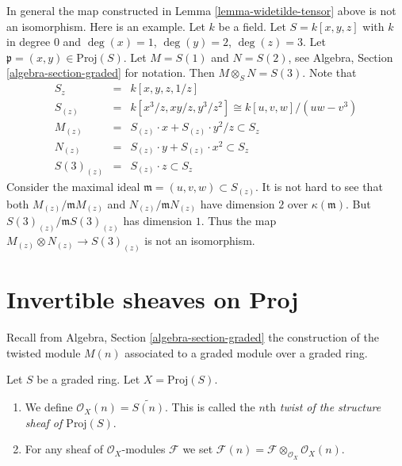 \begin{remark}
\label{remark-not-isomorphism}
In general the map constructed in Lemma \ref{lemma-widetilde-tensor}
above is not an isomorphism. Here is an example. Let $k$
be a field. Let $S = k[x, y, z]$ with $k$ in degree $0$ and
$\deg(x) = 1$, $\deg(y) = 2$, $\deg(z) = 3$.
Let $\mathfrak p = (x, y) \in \text{Proj}(S)$.
Let $M = S(1)$ and $N = S(2)$, see
Algebra, Section \ref{algebra-section-graded}
for notation. Then $M \otimes_S N = S(3)$.
Note that
\begin{eqnarray*}
S_z
& = &
k[x, y, z, 1/z] \\
S_{(z)}
& = &
k[x^3/z, xy/z, y^3/z^2]
\cong
k[u, v, w]/(uw - v^3) \\
M_{(z)} & = & S_{(z)} \cdot x + S_{(z)} \cdot y^2/z \subset S_z \\
N_{(z)} & = & S_{(z)} \cdot y + S_{(z)} \cdot x^2 \subset S_z \\
S(3)_{(z)} & = & S_{(z)} \cdot z \subset S_z
\end{eqnarray*}
Consider the maximal ideal $\mathfrak m = (u, v, w) \subset S_{(z)}$.
It is not hard to see that both $M_{(z)}/\mathfrak mM_{(z)}$
and $N_{(z)}/\mathfrak mN_{(z)}$ have dimension $2$ over
$\kappa(\mathfrak m)$. But
$S(3)_{(z)}/\mathfrak mS(3)_{(z)}$ has dimension $1$.
Thus the map $M_{(z)}\otimes N_{(z)} \to S(3)_{(z)}$ is not
an isomorphism.
\end{remark}









\section{Invertible sheaves on Proj}
\label{section-invertible-on-proj}

\noindent
Recall from Algebra, Section \ref{algebra-section-graded}
the construction of the twisted module $M(n)$ associated
to a graded module over a graded ring.

\begin{definition}
\label{definition-twist}
Let $S$ be a graded ring. Let $X = \text{Proj}(S)$.
\begin{enumerate}
\item We define $\mathcal{O}_X(n) = \widetilde{S(n)}$.
This is called the $n$th
{\it twist of the structure sheaf of $\text{Proj}(S)$}.
\item For any sheaf of $\mathcal{O}_X$-modules $\mathcal{F}$ we set
$\mathcal{F}(n) = \mathcal{F} \otimes_{\mathcal{O}_X} \mathcal{O}_X(n)$.
\end{enumerate}
\end{definition}

